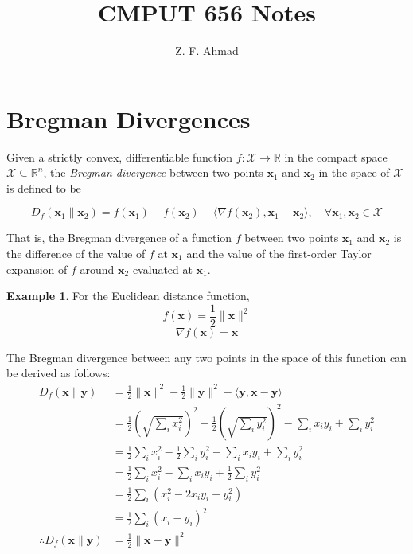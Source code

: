 \documentclass[10pt]{article}
\title{CMPUT 656 Notes}
\author{Z. F. Ahmad}
\date{}
\theoremstyle{definition}
\newtheorem{exmp}{Example}
\begin{document}
\section*{Bregman Divergences}

Given a strictly convex, differentiable function $f:\mathcal{X}\rightarrow \mathbb{R}$ in the compact space $\mathcal{X} \subseteq \mathbb{R}^n$, the \emph{Bregman divergence} between two points $\mathbf{x}_1$ and $\mathbf{x}_2$ in the space of $\mathcal{X}$ is defined to be

\begin{equation}
D_f(\mathbf{x}_1\lVert\mathbf{x}_2) = f(\mathbf{x}_1) - f(\mathbf{x}_2) - \langle\nabla f(\mathbf{x}_2), \mathbf{x}_1 - \mathbf{x}_2\rangle, \quad{} \forall \mathbf{x}_1,\mathbf{x}_2 \in \mathcal{X}
\end{equation}

\noindent
That is, the Bregman divergence of a function $f$ between two points $\mathbf{x}_1$ and $\mathbf{x}_2$ is the difference of the value of $f$ at $\mathbf{x}_1$ and the value of the first-order Taylor expansion of $f$ around $\mathbf{x}_2$ evaluated at $\mathbf{x}_1$.

\begin{exmp}

\noindent
For the Euclidean distance function, 
$$
f(\mathbf{x}) = \frac{1}{2} \lVert \mathbf{x} \rVert ^2
$$
$$
\nabla f(\mathbf{x}) = \mathbf{x}
$$

The Bregman divergence between any two points in the space of this function can be derived as follows:
\begin{equation}
\begin{aligned}
D_f(\mathbf{x}\lVert\mathbf{y}) & = \frac{1}{2} \lVert \mathbf{x} \rVert ^2 - \frac{1}{2} \lVert \mathbf{y} \rVert ^2 - \langle \mathbf{y}, \mathbf{x} - \mathbf{y} \rangle \\
& = \frac{1}{2}\left( \sqrt{\sum_i x_i^2} \right)^2 - \frac{1}{2}\left( \sqrt{\sum_i y_i^2} \right)^2
- \sum_i x_i y_i + \sum_i y_i^2 \\
& = \frac{1}{2}\sum_i x_i^2 - \frac{1}{2}\sum_i y_i^2 - \sum_i x_i y_i + \sum_i y_i^2 \\
& = \frac{1}{2}\sum_i x_i^2 - \sum_i x_i y_i + \frac{1}{2}\sum_i y_i^2 \\
& = \frac{1}{2}\sum_i (x_i^2 - 2 x_i y_i + y_i^2) \\
& = \frac{1}{2}\sum_i (x_i - y_i)^2 \\
\therefore D_f(\mathbf{x}\lVert\mathbf{y}) & = \frac{1}{2} \lVert \mathbf{x} - \mathbf{y} \rVert^2
\end{aligned}
\end{equation}

\end{exmp}
\end{document}
